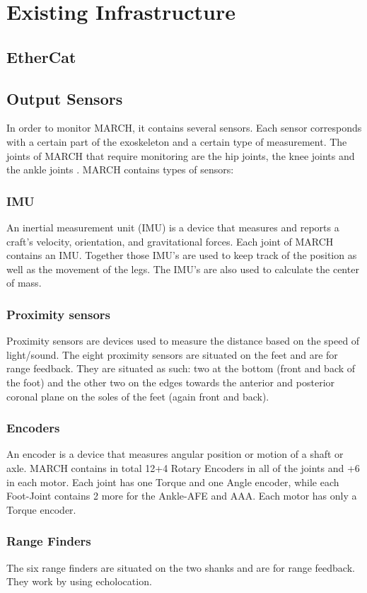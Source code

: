 \section{Existing Infrastructure}
\subsection{EtherCat}

\subsection{Output Sensors}
In order to monitor MARCH, it contains several sensors. Each sensor corresponds with a certain part of the exoskeleton and a certain type of measurement. The joints of MARCH that require monitoring are the hip joints, the knee joints and the ankle joints . MARCH contains  types of sensors:
\subsubsection{IMU}
An inertial measurement unit (IMU) is a device that measures and reports a craft's velocity, orientation, and gravitational forces. Each joint of MARCH contains an IMU. Together those IMU's are used to keep track of the position as well as the movement of the legs. The IMU's are also used to calculate the center of mass. 
\subsubsection{Proximity sensors}
Proximity sensors are devices used to measure the distance based on the speed of light/sound. The eight proximity sensors are situated on the feet and are for range feedback. They are situated as such: two at the bottom (front and back of the foot) and the other two on the edges towards the anterior and posterior coronal plane on the soles of the feet (again front and back). 

\subsubsection{Encoders}
An encoder is a device that measures angular position or motion of a shaft or axle. MARCH contains in total 12+4 Rotary Encoders in all of the joints and +6 in each motor. Each joint has one Torque and one Angle encoder, while each Foot-Joint contains 2 more for the Ankle-AFE and AAA. Each motor has only a Torque encoder.
\subsubsection{Range Finders}
The six range finders are situated on the two shanks and are for range feedback. They work by using echolocation.
